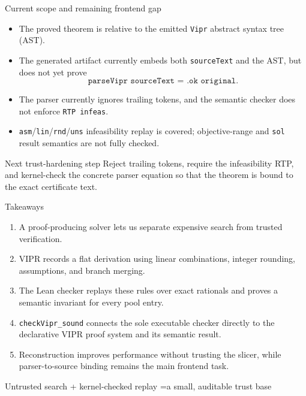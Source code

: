 \documentclass[aspectratio=169,11pt]{beamer}
\newcommand{\vipr}{\textsc{VIPR}}
\newcommand{\code}[1]{\texttt{#1}}
\begin{document}
\begin{frame}{Current scope and remaining frontend gap}
  \begin{itemize}
    \item The proved theorem is relative to the emitted \code{Vipr} abstract syntax
          tree (AST).
    \item The generated artifact currently embeds both \code{sourceText} and the AST,
          but does not yet prove
          \[
            \code{parseVipr sourceText = .ok original}.
          \]
    \item The parser currently ignores trailing tokens, and the semantic checker does
          not enforce \code{RTP infeas}.
    \item \code{asm}/\code{lin}/\code{rnd}/\code{uns} infeasibility replay is covered;
          objective-range and \code{sol} result semantics are not fully checked.
  \end{itemize}

  \begin{block}{Next trust-hardening step}
    Reject trailing tokens, require the infeasibility RTP, and kernel-check the
    concrete parser equation so that the theorem is bound to the exact certificate text.
  \end{block}
\end{frame}

\begin{frame}{Takeaways}
  \begin{enumerate}
    \item A proof-producing solver lets us separate expensive search from trusted
          verification.
    \item \vipr{} records a flat derivation using linear combinations, integer
          rounding, assumptions, and branch merging.
    \item The Lean checker replays these rules over exact rationals and proves a
          semantic invariant for every pool entry.
    \item \code{checkVipr\_sound} connects the sole executable checker directly
          to the declarative VIPR proof system and its semantic result.
    \item Reconstruction improves performance without trusting the slicer, while
          parser-to-source binding remains the main frontend task.
  \end{enumerate}

  \vspace{0.8em}
  \begin{center}
    \Large
    \alert{Untrusted search} \quad+\quad
    \textcolor{proofgreen}{kernel-checked replay}
    \quad=\quad a small, auditable trust base
  \end{center}
\end{frame}
\end{document}

